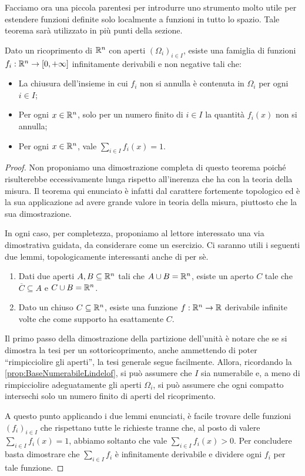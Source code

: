 Facciamo ora una piccola parentesi per introdurre uno strumento molto utile per estendere funzioni definite solo localmente a funzioni in tutto lo spazio. Tale teorema sarà utilizzato in più punti della sezione.

\begin{theorem}\label{thm:PartizioneUnita}
	Dato un ricoprimento di $\mathbb R^n$ con aperti $(\Omega_i)_{i\in I}$, esiste una famiglia di funzioni $f_i:\mathbb R^n\to[0,+\infty]$ infinitamente derivabili
	e non negative tali che:
	\begin{itemize}
		\item La chiusura dell'insieme in cui $f_i$ non si annulla è contenuta in $\Omega_i$ per ogni $i\in I$;
		\item Per ogni $x\in\mathbb R^n$, solo per un numero finito di $i\in I$ la quantità $f_i(x)$ non si annulla;
		\item Per ogni $x\in\mathbb R^n$, vale $\sum_{i\in I} f_i(x)=1$.
	\end{itemize}
\end{theorem}
\begin{proof}
	Non proponiamo una dimostrazione completa di questo teorema poiché risulterebbe eccessivamente lunga rispetto all'inerenza che ha con la teoria della misura. Il teorema qui enunciato è infatti dal carattere fortemente topologico ed è la sua applicazione ad avere grande valore in teoria della misura, piuttosto che la sua dimostrazione.
	
	In ogni caso, per completezza, proponiamo al lettore interessato una via dimostrativa guidata, da considerare come un esercizio.
	Ci saranno utili i seguenti due lemmi, topologicamente interessanti anche di per sè.
	\begin{enumerate}
		\item Dati due aperti $A,B\subseteq \mathbb R^n$ tali che $A\cup B=\mathbb R^n$, esiste un aperto $C$ tale che $\overline{C}\subseteq A$ e $C\cup B=\mathbb R^n$.
		\item Dato un chiuso $C\subseteq \mathbb R^n$, esiste una funzione $f:\mathbb R^n\to\mathbb R$ derivabile infinite volte che come supporto ha esattamente $C$.
	\end{enumerate}
	
	Il primo passo della dimostrazione della partizione dell'unità è notare che se si dimostra la tesi per un sottoricoprimento, anche ammettendo di poter ``rimpicciolire gli aperti'', la tesi generale segue facilmente. 
	Allora, ricordando la \cref{prop:BaseNumerabileLindelof}, si può assumere che $I$ sia numerabile e, a meno di rimpicciolire adeguatamente gli aperti $\Omega_i$, si può assumere che ogni compatto intersechi solo un numero finito di aperti del ricoprimento.
	
	A questo punto applicando i due lemmi enunciati, è facile trovare delle funzioni $(f_i)_{i\in I}$ che rispettano tutte le richieste tranne che, al posto di valere $\sum_{i\in I} f_i(x)=1$, abbiamo soltanto che vale $\sum_{i\in I} f_i(x)>0$.
	Per concludere basta dimostrare che $\sum_{i\in I}f_i$ è infinitamente derivabile e dividere ogni $f_i$ per tale funzione.
\end{proof}

